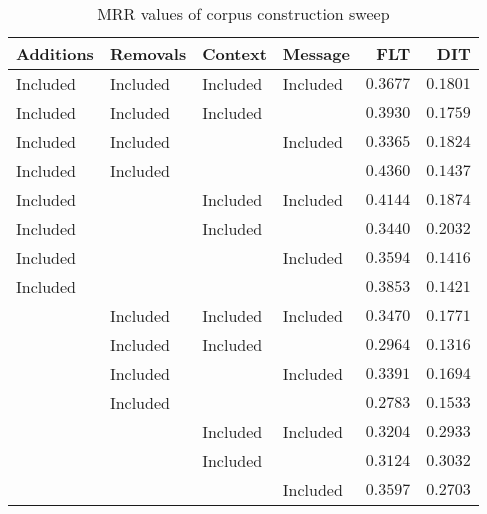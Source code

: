 
\begin{table}
\begin{spacing}{1.2}
\centering
\caption{MRR values of \pig corpus construction sweep}
\label{table:pig_corpus_sweep}
\vspace{0.2em}
\begin{tabular}{llll|rr}
\toprule
Additions &  Removals &   Context &   Message &           FLT &           DIT \\
\midrule
 Included &  Included &  Included &  Included &      $0.3677$ &      $0.1801$ \\
 \myrowcolor Included &  Included &  Included &           &      $0.3930$ &      $0.1759$ \\
 Included &  Included &           &  Included &      $0.3365$ &      $0.1824$ \\
 Included &  Included &           &           & $\bm{0.4360}$ &      $0.1437$ \\
 Included &           &  Included &  Included &      $0.4144$ &      $0.1874$ \\
 Included &           &  Included &           &      $0.3440$ &      $0.2032$ \\
 Included &           &           &  Included &      $0.3594$ &      $0.1416$ \\
 Included &           &           &           &      $0.3853$ &      $0.1421$ \\
          &  Included &  Included &  Included &      $0.3470$ &      $0.1771$ \\
          &  Included &  Included &           &      $0.2964$ &      $0.1316$ \\
          &  Included &           &  Included &      $0.3391$ &      $0.1694$ \\
          &  Included &           &           &      $0.2783$ &      $0.1533$ \\
          &           &  Included &  Included &      $0.3204$ &      $0.2933$ \\
          &           &  Included &           &      $0.3124$ & $\bm{0.3032}$ \\
          &           &           &  Included &      $0.3597$ &      $0.2703$ \\
\bottomrule
\end{tabular}

\end{spacing}
\end{table}
